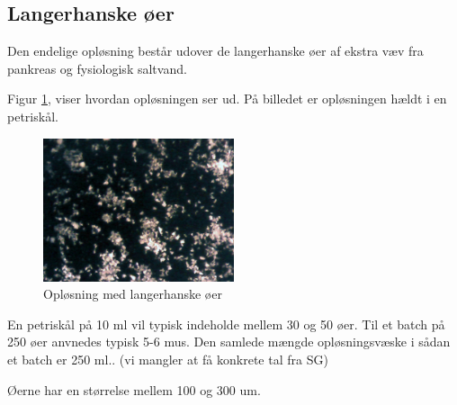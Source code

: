 \subsection{Langerhanske øer}
Den endelige opløsning består udover de langerhanske øer af ekstra væv fra pankreas og fysiologisk saltvand.

Figur \ref{fig:islet}, viser hvordan opløsningen ser ud. På billedet er opløsningen hældt i en petriskål.

\begin{figure}[H]
	\centering
	\includegraphics[width=0.5\textwidth]{billeder/software/2.jpg}
	\caption{Opløsning med langerhanske øer}
	\label{fig:islet}
\end{figure}

En petriskål på 10 ml vil typisk indeholde mellem 30 og 50 øer. Til et batch på 250 øer anvnedes typisk 5-6 mus. Den samlede mængde opløsningsvæske i sådan et batch er 250 ml.. (vi mangler at få konkrete tal fra SG)

Øerne har en størrelse mellem 100 og 300 um.





